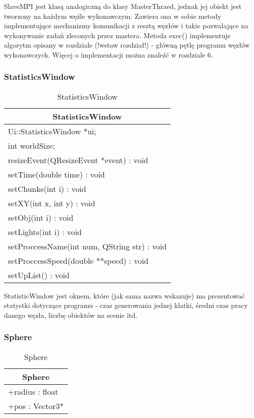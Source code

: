 SlaveMPI jest klasą analogiczną do klasy MasterThraed, jednak jej obiekt jest tworzony na każdym węźle wykonawczym. Zawiera ona w sobie metody implementujące mechanizmy komunikacji z resztą węzłów i takie pozwalające na wykonywanie zadań zleconych przez mastera. Metoda exec() implementuje algorytm opisany w rozdziale (!wstaw rozdział!) - główną pętlę programu węzłów wykonawczych. Więcej o implementacji można znaleźć w rozdziale 6.

\subsubsection{StatisticsWindow}

\footnotesize
\begin{longtable}{|p{14cm}|}
    \caption{StatisticsWindow} \label{tab:StatisticsWindow} \\ \hline
    \multicolumn{1}{|c|}{StatisticsWindow} \\ \hline
    Ui::StatisticsWindow *ui; \\
    int worldSize; \\
    \hline
	resizeEvent(QResizeEvent *event) : void \\
    setTime(double time) : void  \\
    setChunks(int i) : void \\
    setXY(int x, int y) : void \\
    setObj(int i) : void \\
    setLights(int i) : void  \\
    setProccessName(int num, QString str) : void \\
    setProccessSpeed(double **speed) : void \\
    setUpList() : void \\
    \hline
\end{longtable}
\normalsize

StatisticWindow jest oknem, które (jak sama nazwa wskazuje) ma prezentować statystki dotyczące programu - czas generowania jednej klatki, średni czas pracy danego węzła, liczbę obiektów na scenie itd.

\subsubsection{Sphere}

\footnotesize
\begin{longtable}{|p{14cm}|}
    \caption{Sphere} \label{tab:Sphere} \\ \hline
    \multicolumn{1}{|c|}{Sphere} \\ \hline
    +radius : float \\
    +pos : Vector3* \\
    \hline
\end{longtable}
\normalsize

